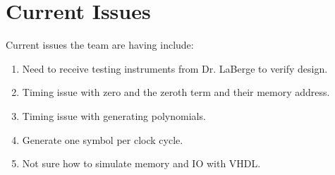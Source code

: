 \documentclass[paper=usletter, fontsize=12pt]{article}
\begin{document}
    \section{Current Issues} Current issues the team are having include: 
	
	\begin{enumerate}[label=\alph*)]
		\item Need to receive testing instruments from Dr. LaBerge to verify design. 
		\item Timing issue with zero and the zeroth term and their memory address.
		\item Timing issue with generating polynomials.		
		\item Generate one symbol per clock cycle.
		\item Not sure how to simulate memory and IO with VHDL.
	\end{enumerate}
    
   
   
\end{document}
